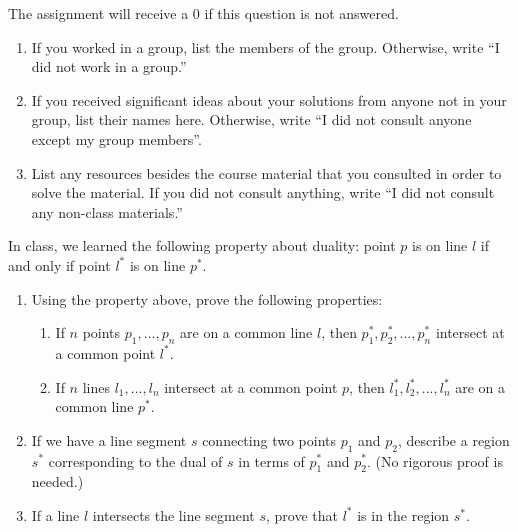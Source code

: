 \documentclass[11pt]{article}
\begin{document}
\begin{qunlist}
\setcounter{sparectr}{-1}

	The assignment will receive a 0 if this question is not answered.
\begin{enumerate}
	\item If you worked in a group, list the members of the group. Otherwise, write ``I did not work in a group.''
	\item If you received significant ideas about your solutions from anyone not in your group, list their names here. Otherwise, write ``I did not consult  anyone except my group members''.
	\item List any resources besides the course material that you consulted in order to solve the material. If you did not consult anything, write ``I did not consult any non-class materials.''
\end{enumerate}

In class, we learned the following property about duality: point $p$ is on line $l$ if and only if point $l^*$ is on line $p^*$.
\begin{enumerate}
    \item Using the property above, prove the following properties:
    \begin{enumerate}
        \item If $n$ points $p_1, ..., p_n$ are on a common line $l$, then $p_1^*, p_2^*, ..., p_n^*$ intersect at a common point $l^*$.
        \item If $n$ lines $l_1, ..., l_n$ intersect at a common point $p$, then $l_1^*, l_2^*, ..., l_n^*$ are on a common line $p^*$.
    \end{enumerate}
    \item If we have a line segment $s$ connecting two points $p_1$ and $p_2$, describe a region $s^*$ corresponding to the dual of $s$ in terms of $p_1^*$ and $p_2^*$. (No rigorous proof is needed.)
    \item If a line $l$ intersects the line segment $s$, prove that $l^*$ is in the region $s^*$.
\end{enumerate}


\end{qunlist}
\end{document}

